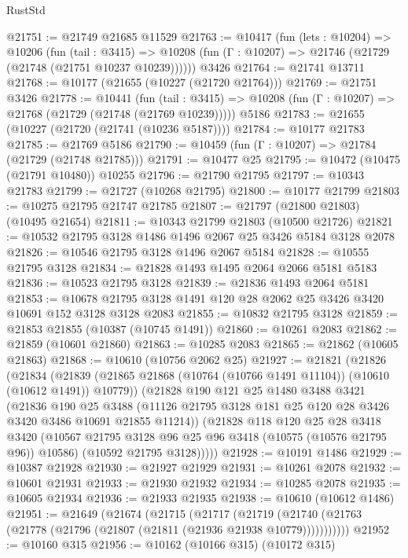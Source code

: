 \begin{lexlean}{RustStd}
\begin{coremodule}
@21751 := @21749 @21685 @11529
@21763 := @10417
    (fun (lets : @10204) =>
    @10206
      (fun (tail : @3415) =>
      @10208 (fun (Γ : @10207) => @21746 (@21729 (@21748 (@21751 @10237 @10239))))))
    @3426
@21764 := @21741 @13711
@21768 := @10177 (@21655 (@10227 (@21720 @21764)))
@21769 := @21751 @3426
@21778 := @10441
    (fun (tail : @3415) => @10208 (fun (Γ : @10207) => @21768 (@21729 (@21748 (@21769 @10239)))))
    @5186
@21783 := @21655 (@10227 (@21720 (@21741 (@10236 @5187))))
@21784 := @10177 @21783
@21785 := @21769 @5186
@21790 := @10459 (fun (Γ : @10207) => @21784 (@21729 (@21748 @21785)))
@21791 := @10477 @25
@21795 := @10472 (@10475 (@21791 @10480)) @10255
@21796 := @21790 @21795
@21797 := @10343 @21783
@21799 := @21727 (@10268 @21795)
@21800 := @10177 @21799
@21803 := @10275 @21795 @21747 @21785
@21807 := @21797 (@21800 @21803) (@10495 @21654)
@21811 := @10343 @21799 @21803 (@10500 @21726)
@21821 := @10532 @21795 @3128 @1486 @1496 @2067 @25 @3426 @5184 @3128 @2078
@21826 := @10546 @21795 @3128 @1496 @2067 @5184
@21828 := @10555 @21795 @3128
@21834 := @21828 @1493 @1495 @2064 @2066 @5181 @5183
@21836 := @10523 @21795 @3128
@21839 := @21836 @1493 @2064 @5181
@21853 := @10678 @21795 @3128 @1491 @120 @28 @2062 @25 @3426 @3420 @10691 @152 @3128 @3128 @2083
@21855 := @10832 @21795 @3128
@21859 := @21853 @21855 (@10387 (@10745 @1491))
@21860 := @10261 @2083
@21862 := @21859 (@10601 @21860)
@21863 := @10285 @2083
@21865 := @21862 (@10605 @21863)
@21868 := @10610 (@10756 @2062 @25)
@21927 := @21821
    (@21826
      (@21834
        (@21839 (@21865 @21868 (@10764 (@10766 @1491 @11104)) (@10610 (@10612 @1491)) @10779))
        (@21828
          @190
          @121
          @25
          @1480
          @3488
          @3421
          (@21836
            @190
            @25
            @3488
            (@11126 @21795 @3128 @181 @25 @120 @28 @3426 @3420 @3486 @10691 @21855 @11214))
          (@21828
            @118
            @120
            @25
            @28
            @3418
            @3420
            (@10567 @21795 @3128 @96 @25 @96 @3418 (@10575 (@10576 @21795 @96)) @10586)
            (@10592 @21795 @3128)))))
@21928 := @10191 @1486
@21929 := @10387 @21928
@21930 := @21927 @21929
@21931 := @10261 @2078
@21932 := @10601 @21931
@21933 := @21930 @21932
@21934 := @10285 @2078
@21935 := @10605 @21934
@21936 := @21933 @21935
@21938 := @10610 (@10612 @1486)
@21951 := @21649
    (@21674
      (@21715
        (@21717
          (@21719 (@21740 (@21763 (@21778 (@21796 (@21807 (@21811 (@21936 @21938 @10779)))))))))))
@21952 := @10160 @315
@21956 := @10162 (@10166 @315) (@10172 @315)

\end{coremodule}
\end{lexlean}
